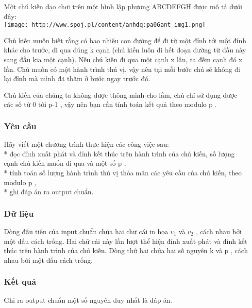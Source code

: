 



   Một chú kiến dạo chơi trên một hình lập phương ABCDEFGH được mô tả dưới đây:   
\\
\texttt{[image: http://www.spoj.pl/content/anhdq:pa06ant\_img1.png]}



   Chú kiến muốn biết rằng có bao nhiêu con đường để đi từ một đỉnh tới một đỉnh khác cho trước, đi qua đúng       k      cạnh (chú kiến luôn đi hết đoạn đường từ đầu này sang đầu kia một cạnh). Nếu chú kiến đi qua một cạnh       x      lần, ta đếm cạnh đó       x      lần. Chú muốn có một hành trình thú vị, vậy nên tại mỗi bước chú sẽ không đi lại đỉnh mà mình đã thăm ở bước ngay trước đó.  

   Chú kiến của chúng ta không được thông minh cho lắm, chú chỉ sử dụng được các số từ       0      tới       p-1      , vậy nên bạn cần tính toán kết quả theo modulo       p      .  

\subsubsection{   Yêu cầu  }

   Hãy viết một chương trình thực hiện các công việc sau:   
\\   * đọc đỉnh xuất phát và đỉnh kết thúc trên hành trình của chú kiến, số lượng cạnh chú kiến muốn đi qua và một số       p      ,   
\\   * tính toán số lượng hành trình thú vị thỏa mãn các yêu cầu của chú kiến, theo modulo       p      ,   
\\   * ghi đáp án ra output chuẩn.  

\subsubsection{   Dữ liệu  }

   Dòng đầu tiên của input chuẩn chứa hai chữ cái in hoa       $v_{1}$      và       $v_{2}$      , cách nhau bởi một dấu cách trống. Hai chữ cái này lần lượt thể hiện đỉnh xuất phát và đỉnh kết thúc trên hành trình của chú kiến. Dòng thứ hai chứa hai số nguyên       k      và       p      , cách nhau bởi một dấu cách trống.  

\subsubsection{   Kết quả  }

   Ghi ra output chuẩn một số nguyên duy nhất là đáp án.  

